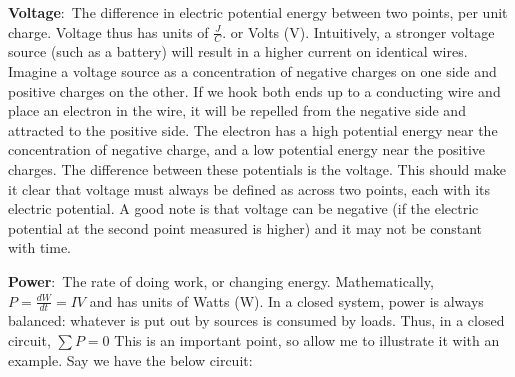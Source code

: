 \documentclass[nobib]{tufte-handout}
\newcommand{\defn}[2]{\noindent\textbf{#1}:\ #2}
\begin{document}
\defn{Voltage}{The difference in electric potential energy
between two points, per unit charge.} Voltage thus has units of
$\frac{J}{C}$. or Volts (V).
Intuitively, a stronger voltage source (such
as a battery) will result in a higher current on 
identical wires. Imagine a voltage source
as a concentration of negative charges on
one side and positive charges on the other. 
If we hook both ends up to a conducting wire and place 
an electron in the wire, it will be repelled 
from the negative side and attracted to the
positive side. The electron has a high
potential energy near the concentration of
negative charge, and a low potential energy
near the positive charges. The difference
between these potentials is the voltage. This should
make it clear that voltage must always be
defined as across two points, each with its
electric potential. A good note is that
voltage can be negative (if the electric 
potential at the second point measured is higher)
and it may not be constant with time. 

\defn{Power}{The rate of doing work, or changing energy.} 
Mathematically, $P = \frac{dW}{dt} = IV$ and has units of Watts (W).
In a closed system, power is always balanced: whatever 
is put out by sources is consumed by
loads. Thus, in a closed circuit, $\sum P = 0$ This
is an important point, so allow me to illustrate it with 
an example. Say we have the below circuit:
\end{document}

